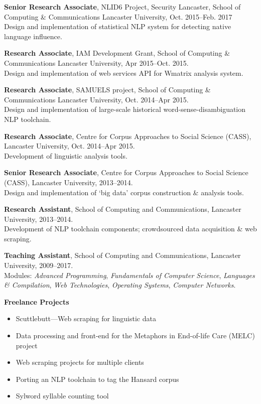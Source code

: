 \documentclass{res}
\begin{document}
\begin{resume}
    {\bf Senior Research Associate},
    NLID6 Project, Security Lancaster, School of Computing \& Communications
    Lancaster University,
    Oct. 2015--Feb. 2017\\
    Design and implementation of statistical NLP system for detecting native language influence.

    {\bf Research Associate},
    IAM Development Grant, School of Computing \& Communications
    Lancaster University,
    Apr 2015--Oct. 2015.\\
    Design and implementation of web services API for Wmatrix analysis system.

    {\bf Research Associate},
    SAMUELS project, School of Computing \& Communications
    Lancaster University,
    Oct. 2014--Apr 2015.\\
    Design and implementation of large-scale historical word-sense-disambiguation NLP toolchain.


    {\bf Research Associate},
    Centre for Corpus Approaches to Social Science (CASS),
    Lancaster University,
    Oct. 2014--Apr 2015.\\
    Development of linguistic analysis tools.

    {\bf Senior Research Associate},
    Centre for Corpus Approaches to Social Science (CASS),
    Lancaster University,
    2013--2014.\\
    Design and implementation of `big data' corpus construction \& analysis tools.

    {\bf Research Assistant},
    School of Computing and Communications,
    Lancaster University,
    2013--2014.\\
    Development of NLP toolchain components; crowdsourced data acquisition \& web scraping.

    {\bf Teaching Assistant},
    School of Computing and Communications,
    Lancaster University,
    2009--2017.\\
    Modules: \textsl{Advanced Programming}, \textsl{Fundamentals of Computer Science}, \textsl{Languages \& Compilation}, \textsl{Web Technologies}, \textsl{Operating Systems}, \textsl{Computer Networks}.

    {\bf Freelance Projects}
    \begin{itemize}
        \item Scuttlebutt---Web scraping for linguistic data
        \item Data processing and front-end for the Metaphors in End-of-life Care (MELC) project
        \item Web scraping projects for multiple clients
        \item Porting an NLP toolchain to tag the Hansard corpus
        \item Sylword syllable counting tool
    \end{itemize}


\end{resume}
\end{document}
